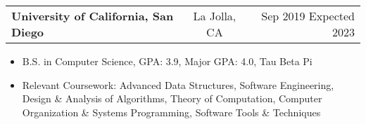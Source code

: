 \documentclass{article}
\begin{document}
 

\begin{tabularx}{\textwidth}{L C R}
  \textbf{University of California, San Diego} & La Jolla, CA & Sep 2019 \textendash{} Expected 2023
\end{tabularx}
\begin{itemize}
  \setlength{\itemsep}{-2pt}
  \item B.S. in Computer Science, GPA\@: 3.9, Major GPA\@: 4.0, Tau Beta Pi
  \item Relevant Coursework: Advanced Data Structures, Software Engineering, Design \& Analysis of Algorithms, Theory of Computation, Computer Organization \& Systems Programming, Software Tools \& Techniques
\end{itemize}
\end{document}
